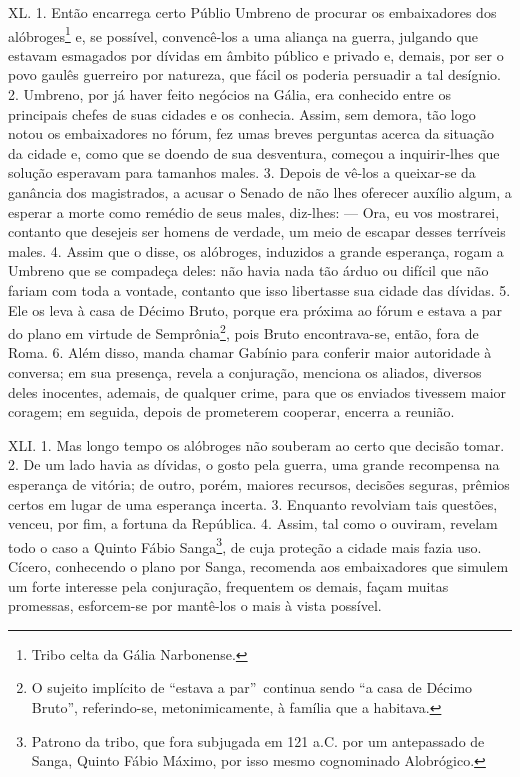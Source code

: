 XL. 1. Então encarrega certo Públio Umbreno de procurar os embaixadores dos
alóbroges\footnote{Tribo celta da Gália Narbonense.} e, se possível,
convencê-los a uma aliança na guerra, julgando que estavam esmagados por
dívidas em âmbito público e privado e, demais, por ser o povo gaulês guerreiro
por natureza, que fácil os poderia persuadir a tal desígnio. 2. Umbreno, por já
haver feito negócios na Gália, era conhecido entre os principais chefes de suas
cidades e os conhecia. Assim, sem demora, tão logo notou os embaixadores no
fórum, fez umas breves perguntas acerca da situação da cidade e, como que se
doendo de sua desventura, começou a inquirir-lhes que solução esperavam para
tamanhos males. 3. Depois de vê-los a queixar-se da ganância dos magistrados, a
acusar o Senado de não lhes oferecer auxílio algum, a esperar a morte como
remédio de seus males, diz-lhes: --- Ora, eu vos mostrarei, contanto que
desejeis ser homens de verdade, um meio de escapar desses terríveis males. 4.
Assim que o disse, os alóbroges, induzidos a grande esperança, rogam a Umbreno
que se compadeça deles: não havia nada tão árduo ou difícil que não fariam com
toda a  vontade, contanto que isso libertasse sua cidade das dívidas. 5. Ele os
leva à casa de Décimo Bruto, porque era próxima ao fórum e estava a par do
plano em virtude de Semprônia\footnote{O sujeito implícito de ``estava a par''\
continua sendo ``a casa de Décimo Bruto'', referindo-se, metonimicamente, à família que a habitava.}, pois Bruto encontrava-se, então,
fora de Roma. 6. Além disso, manda chamar Gabínio para conferir maior
autoridade à conversa; em sua presença, revela a conjuração, menciona os
aliados, diversos deles inocentes, ademais, de qualquer crime, para que os
enviados tivessem maior coragem; em seguida, depois de prometerem cooperar,
encerra a reunião. 

XLI. 1. Mas longo tempo os alóbroges não souberam ao certo que decisão tomar.
2. De um lado havia as dívidas, o gosto pela guerra, uma grande recompensa na
esperança de vitória; de outro, porém, maiores recursos, decisões seguras,
prêmios certos em lugar de uma esperança incerta. 3. Enquanto revolviam tais
questões, venceu, por fim, a fortuna da República. 4. Assim, tal como o
ouviram, revelam todo o caso a Quinto Fábio Sanga\footnote{Patrono da tribo,
que fora subjugada em 121 a.C. por um antepassado de Sanga, Quinto Fábio
Máximo, por isso mesmo cognominado Alobrógico.}, de cuja proteção a cidade mais
fazia uso. Cícero, conhecendo o plano por Sanga, recomenda aos embaixadores que
simulem um forte interesse pela conjuração, frequentem os demais, façam
muitas promessas, esforcem-se por mantê-los o mais à vista possível.

